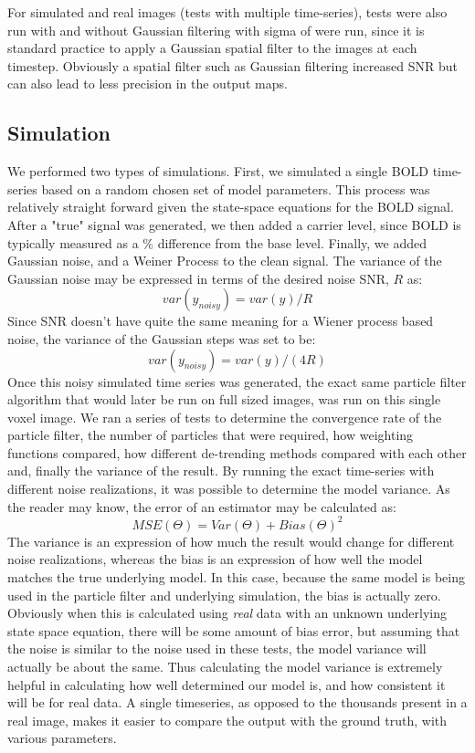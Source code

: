\documentclass{article}
\begin{document}
For simulated and real images (tests with multiple time-series), tests were 
also run with and without Gaussian filtering with sigma of %
were run, since it is standard
practice to apply a Gaussian spatial filter to the images at each timestep. Obviously
a spatial filter such as Gaussian filtering increased SNR but can also lead to less
precision in the output maps.

\subsection{Simulation}
We performed two types of simulations. First, we simulated a single BOLD time-series based
on a random chosen set of model parameters. This process was relatively straight forward
given the state-space equations for the BOLD signal. After a "true" signal was generated,
we then added a carrier level, since BOLD is typically measured as a \% difference from the
base level. Finally, we added Gaussian noise, and a Weiner Process to the clean signal. The
variance of the Gaussian noise may be expressed in terms of the desired noise SNR, $R$ as:
\begin{equation}
var(y_{noisy}) = var(y) / R
\end{equation}
Since SNR doesn't have quite the same meaning for a Wiener process based noise, the variance 
of the Gaussian steps was set to be:
\begin{equation}
var(y_{noisy}) = var(y) / (4R)
\end{equation}
Once this noisy simulated time series was generated, the exact same particle filter algorithm
that would later be run on full sized images, was run on this single voxel image. We ran
a series of tests to determine the convergence rate of the particle filter, the number
of particles that were required, how weighting functions compared, how different de-trending
methods compared with each other and, finally the variance of the result. By running the exact
time-series with different noise realizations, it was possible to determine the model variance.
As the reader may know, the error of an estimator may be calculated as:
\begin{equation}
MSE(\Theta) = Var(\Theta) + Bias(\Theta)^2
\end{equation}
The variance is an expression of how much the result would change for different noise realizations,
whereas the bias is an expression of how well the model matches the true underlying model. In
this case, because the same model is being used in the particle filter and underlying simulation,
the bias is actually zero. Obviously when this is calculated using \emph{real} data with an unknown
underlying state space equation, there will be some amount of bias error, but assuming that the
noise is similar to the noise used in these tests, the model variance will actually be about the
same. Thus calculating the model variance is extremely helpful in calculating how well determined
our model is, and how consistent it will be for real data. A single timeseries, as opposed to the
thousands present in a real image, makes it easier to 
compare the output with the ground truth, with various parameters. 
\end{document}
